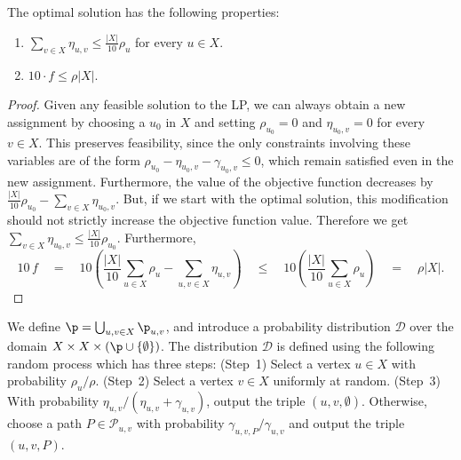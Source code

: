 \begin{lemma}\label{lem:properties_of_dual_lp}
    The optimal solution has the following properties:
    \begin{enumerate}
        \item $\sum_{v\in X}\eta_{u,v} \leq \frac{|X|}{10}\rho_u$ for every $u\in X$.
        \item $10\cdot f \leq \rho|X|$.
    \end{enumerate}
\end{lemma}

\begin{proof}
    Given any feasible solution to the LP, we can always obtain a new assignment by choosing a $u_0$ in $X$ and setting $\rho_{u_0} = 0$ and $\eta_{u_0,v} = 0$ for every $v\in X$. This preserves feasibility, since the only constraints involving these variables are of the form $\rho_{u_0} - \eta_{u_0,v} - \gamma_{u_0,v} \leq 0$, which remain satisfied even in the new assignment. Furthermore, the value of the objective function decreases by $\frac{|X|}{10}\rho_{u_0} - \sum_{v\in X}\eta_{u_0,v}$. But, if we start with the optimal solution, this modification should not strictly increase the objective function value. Therefore we get $\sum_{v\in X}\eta_{u_0,v} \leq \frac{|X|}{10}\rho_{u_0}$. Furthermore,
    $$
    10\,f \quad
    = \quad 10\left(\frac{|X|}{10} \sum_{u \in X} \rho_u - \sum_{u,v \in X} \eta_{u,v}\right) \quad
    \leq \quad 10\left(\frac{|X|}{10} \sum_{u \in X} \rho_u\right) \quad
    = \quad \rho|X|.
    $$
\end{proof}

We define $\p = \bigcup_{u,v \in X} \p_{u,v}$, and introduce a probability distribution $\mathcal{D}$ over the domain $X\times X\times (\p \cup \{\emptyset\})$. The distribution $\mathcal{D}$ is defined using the following random process which has three steps: (Step~1) Select a vertex $u \in X$ with probability $\rho_u / \rho$. (Step~2) Select a vertex $v \in X$ uniformly at random.  (Step~3) With probability $\eta_{u,v} / (\eta_{u,v} + \gamma_{u,v})$, output the triple $(u, v, \emptyset)$. Otherwise, choose a path $P \in \mathcal{P}_{u,v}$ with probability $\gamma_{u,v,P} / \gamma_{u,v}$ and output the triple $(u, v, P)$. 

